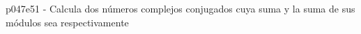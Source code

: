 \documentclass[spanish, 11pt]{exam}
\begin{document}
\begin{questions}
\begin{multicols}{2}
        \end{multicols}
        \question p047e51 - Calcula dos números complejos conjugados cuya suma y la suma de sus módulos sea respectivamente
        \begin{multicols}{2} 
        \end{multicols}
        
    \end{questions}
    
\end{document}
